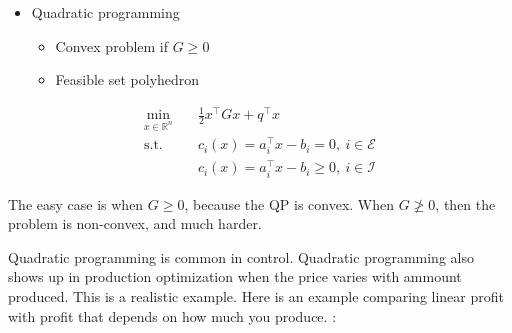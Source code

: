 \documentclass{article}
\begin{document}
\maketitle

\begin{minipage}[c]{0.3\textwidth}
  \raggedright
  \begin{itemize}
    \item Quadratic programming
          \begin{itemize}
            \item Convex problem  if $G \geq 0$
            \item Feasible set polyhedron
          \end{itemize}
  \end{itemize}
\end{minipage}
\begin{minipage}[c]{0.3\textwidth}
  \centering
  \begin{align*}
    \min_{x\in \mathbb{R}^{n}} \quad & \frac{1}{2}x^{\top}Gx + q^{\top}x                    \\
    \text{s.t.} \quad                & c_i(x) = a_i^{\top}x - b_i = 0,\ i\in \mathcal{E}    \\
                                     & c_i(x) = a_i^{\top}x -b_i \geq 0,\  i\in \mathcal{I}
  \end{align*}
\end{minipage}
\begin{minipage}[c]{0.3\textwidth}
  \raggedleft
\end{minipage}

The easy case is when $G \geq 0$, because the QP is convex. When $G \ngeq 0$, then the problem is non-convex, and much harder.

\medskip Quadratic programming is common in control. Quadratic programming also shows up in production optimization when the price varies with ammount produced. This is a
realistic example. Here is an example comparing linear profit with profit that depends on how much you produce. :
\end{document}
